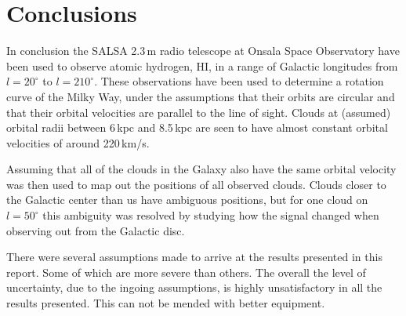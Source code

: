 \documentclass[11pt,a4paper, twocolumn,
swedish, english %
]{article}
\begin{document}
\section{Conclusions}
In conclusion the SALSA 2.3\,m radio telescope at Onsala Space
Observatory have been used to observe atomic hydrogen, HI, in a range
of Galactic longitudes from $l=20^\circ$ to $l=210^\circ$. These
observations have been used to determine a rotation curve of the Milky 
Way, under the assumptions that their orbits are circular and that
their orbital velocities are parallel to the line of sight. Clouds at
(assumed) orbital radii between 6\,kpc and 8.5\,kpc are seen to have
almost constant orbital velocities of around 220\,km/s.

Assuming that all of the clouds in the Galaxy also have the same
orbital velocity was then used to map out the positions of all
observed clouds. Clouds closer to the Galactic center than us have
ambiguous positions, but for one cloud on $l=50^\circ$ this ambiguity
was resolved by studying how the signal changed when observing out
from the Galactic disc.

There were several assumptions made to arrive at the results presented
in this report. Some of which are more severe than others. The overall
the level of uncertainty, due to the ingoing assumptions, is highly
unsatisfactory in all the results presented. This can not be mended
with better equipment. 










%


\end{document}
